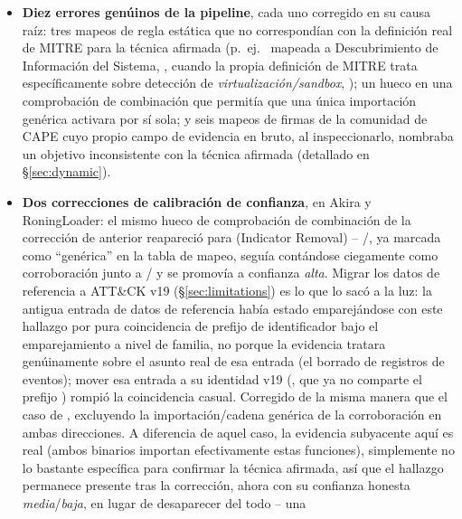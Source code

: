 \begin{itemize}
  \item \textbf{Diez errores gen\'uinos de la pipeline}, cada uno
    corregido en su causa ra\'iz: tres mapeos de regla est\'atica que no
    correspond\'ian con la definici\'on real de MITRE para la t\'ecnica
    afirmada (p.\ ej.\  mapeada a Descubrimiento de
    Informaci\'on del Sistema, , cuando la propia
    definici\'on de MITRE trata espec\'ificamente sobre detecci\'on de
    \emph{virtualizaci\'on/sandbox}, ); un hueco en una
    comprobaci\'on de combinaci\'on que permit\'ia que una \'unica
    importaci\'on gen\'erica activara  por s\'i sola; y
    seis mapeos de firmas de la comunidad de CAPE cuyo propio campo de
    evidencia en bruto, al inspeccionarlo, nombraba un objetivo
    inconsistente con la t\'ecnica afirmada (detallado en
    \S\ref{sec:dynamic}).
  \item \textbf{Dos correcciones de calibraci\'on de confianza}, en
    Akira y RoningLoader: el mismo hueco de comprobaci\'on de
    combinaci\'on de la correcci\'on de  anterior
    reapareci\'o para  (Indicator Removal) --
    /, ya marcada como ``gen\'erica''
    en la tabla de mapeo, segu\'ia cont\'andose ciegamente como
    corroboraci\'on junto a / y se
    promov\'ia a confianza \emph{alta}. Migrar los datos de referencia a
    ATT\&CK v19 (\S\ref{sec:limitations}) es lo que lo sac\'o a la luz:
    la antigua entrada de datos de referencia 
    hab\'ia estado emparej\'andose con este hallazgo por pura
    coincidencia de prefijo de identificador bajo el emparejamiento a
    nivel de familia, no porque la evidencia tratara gen\'uinamente
    sobre el asunto real de esa entrada (el borrado de registros de
    eventos); mover esa entrada a su identidad v19
    (, que ya no comparte el prefijo
    ) rompi\'o la coincidencia casual. Corregido de la
    misma manera que el caso de , excluyendo la
    importaci\'on/cadena gen\'erica de la corroboraci\'on en ambas
    direcciones. A diferencia de aquel caso, la evidencia subyacente
    aqu\'i es real (ambos binarios importan efectivamente estas
    funciones), simplemente no lo bastante espec\'ifica para confirmar
    la t\'ecnica afirmada, as\'i que el hallazgo permanece presente
    tras la correcci\'on, ahora con su confianza honesta
    \emph{media}/\emph{baja}, en lugar de desaparecer del todo -- una

\end{itemize}
